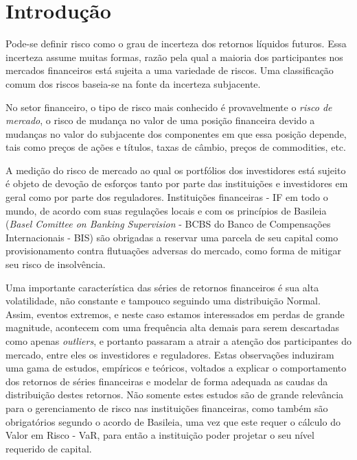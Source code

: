 \documentclass[1p]{elsarticle}
\theoremstyle{definition}
\begin{document}
\linenumbers

\section{Introdução}

Pode-se definir risco como o grau de incerteza dos retornos líquidos futuros. Essa incerteza assume muitas formas, razão pela qual a maioria dos participantes nos mercados financeiros está sujeita a uma variedade de riscos. Uma classificação comum dos riscos baseia-se na fonte da incerteza subjacente.

No setor financeiro, o tipo de risco mais conhecido é provavelmente o \emph{risco de mercado}, o risco de mudança no valor de uma posição financeira devido a mudanças no valor do subjacente dos componentes em que essa posição depende, tais como preços de ações e títulos, taxas de câmbio, preços de commodities, etc.

A medição do risco de mercado ao qual os portfólios dos investidores está sujeito é objeto de devoção de esforços tanto por parte das instituições e investidores em geral como por parte dos reguladores. Instituições financeiras - IF em todo o mundo, de acordo com suas regulações locais e com os princípios de Basileia (\emph{Basel Comittee on Banking Supervision} - BCBS do Banco de Compensações Internacionais - BIS) são obrigadas a reservar uma parcela de seu capital como provisionamento contra flutuações adversas do mercado, como forma de mitigar seu risco de insolvência.


Uma importante característica das séries de retornos financeiros é sua alta volatilidade, não constante e tampouco seguindo uma distribuição Normal. Assim, eventos extremos, e neste caso estamos interessados em perdas de grande magnitude, acontecem com uma frequência alta demais para serem descartadas como apenas \emph{outliers}, e portanto passaram a atrair a atenção dos participantes do mercado, entre eles os investidores e reguladores. Estas observações induziram uma gama de estudos, empíricos e teóricos, voltados a explicar o comportamento dos retornos de séries financeiras e modelar de forma adequada as caudas da distribuição destes retornos. Não somente estes estudos são de grande relevância para o gerenciamento de risco nas instituições financeiras, como também são obrigatórios segundo o acordo de Basileia, uma vez que este requer o cálculo do Valor em Risco - VaR, para então a instituição poder projetar o seu nível requerido de capital. 
\end{document}
